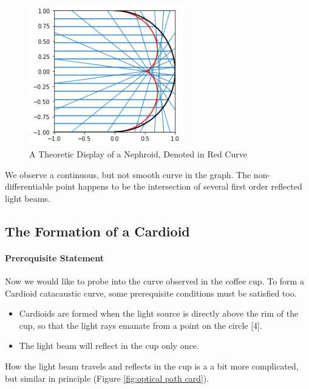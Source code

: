 \documentclass[a4paper]{article}
\begin{document}
\begin{figure}[!htbp]
	\centering
	\includegraphics[width=0.6\textwidth]{nephroid.png}
	\caption{A Theoretic Display of a Nephroid, Denoted in Red Curve}
	\label{fig:nephroid}
\end{figure}

We observe a continuous, but not smooth curve in the graph. The non-differentiable point happens to be the intersection of several first order reflected light beams.
\subsection{The Formation of a Cardioid}
\paragraph{Prerequisite Statement}
Now we would like to probe into the curve observed in the coffee cup. To form a Cardioid catacaustic curve, some prerequisite conditions must be satisfied too.
\begin{itemize}
\item Cardioids are formed when the light source is directly above the rim of the cup, so that the light rays emanate from a point on the circle [4].
\item The light beam will reflect in the cup only once.
\end{itemize}

How the light beam travels and reflects in the cup is a a bit more complicated, but similar in principle (Figure \ref{fig:optical path card}).
\end{document}

